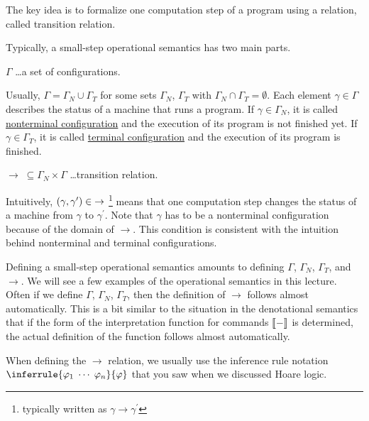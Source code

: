 \begin{enumcirc}
	\item
	The key idea is to formalize one computation step of a program using a
	relation, called transition relation.
	\item
	Typically, a small-step operational semantics has two main parts.
	\begin{enumrm}
		\item
		$\Gamma$ \dots a set of configurations.

		Usually, $\Gamma = \Gamma_N \cup \Gamma_T$ for some sets $\Gamma_N$, $\Gamma_T$
		with $\Gamma_N \cap \Gamma_T = \emptyset$.
		Each element $\gamma \in \Gamma$ describes the status of a machine that runs a
		program.
		If $\gamma \in \Gamma_N$, it is called \ul{nonterminal configuration} and the
		execution of its program is not finished yet.
		If $\gamma \in \Gamma_T$, it is called \ul{terminal configuration} and the
		execution of its program is finished.
		\item
		$\rightarrow \;\subseteq \Gamma_N \times \Gamma$
		\dots transition relation.

		Intuitively, $\left( \gamma, \gamma^\prime \right) \in\; \rightarrow$
		\footnote{typically written as $\gamma \rightarrow \gamma^\prime$}
		means that one computation step changes the status of a machine from $\gamma$
		to $\gamma^\prime$.
		Note that $\gamma$ has to be a nonterminal configuration because of the domain
		of $\rightarrow$.
		This condition is consistent with the intuition behind nonterminal and terminal
		configurations.
	\end{enumrm}
	Defining a small-step operational semantics amounts to defining $\Gamma$,
	$\Gamma_N$, $\Gamma_T$, and $\rightarrow$.
	We will see a few examples of the operational semantics in this lecture.
	Often if we define $\Gamma$, $\Gamma_N$, $\Gamma_T$, then the definition of
	$\rightarrow$ follows almost automatically.
	This is a bit similar to the situation in the denotational semantics that if
	the form of the interpretation function for commands $\left\llbracket - \right\rrbracket$ is
	determined, the actual definition of the function follows almost automatically.
	\item
	When defining the $\rightarrow$ relation, we usually use the inference rule
	notation $\inferrule{\varphi_1 \;\cdots \;\varphi_n}{\varphi}$ that you saw
	when we discussed Hoare logic.
\end{enumcirc}

